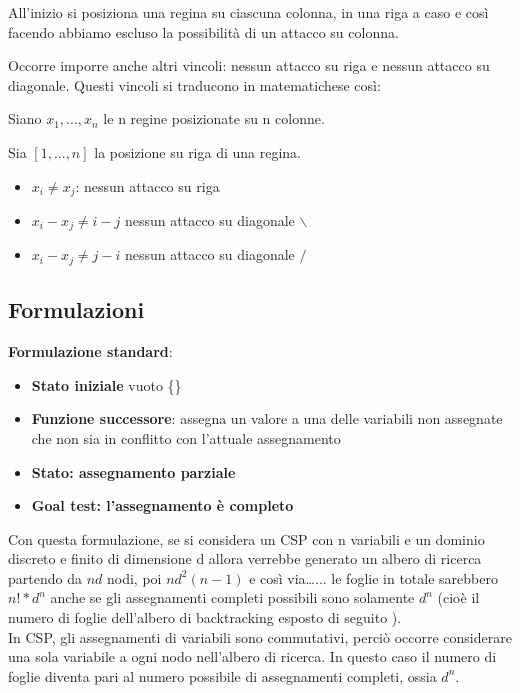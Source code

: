 All'inizio si posiziona una regina su ciascuna colonna, in una riga a caso e
così facendo abbiamo escluso la possibilità di un attacco su colonna.

Occorre imporre anche altri vincoli: nessun attacco su riga e nessun attacco su
diagonale. Questi vincoli si traducono in matematichese così:

Siano $x_1,...,x_n$ le n regine posizionate su n colonne.

Sia $[1,...,n]$ la posizione su riga di una regina.

\begin{itemize}
 \item $x_i \neq x_j$: nessun attacco su riga
 \item $x_i - x_j \neq i-j$ nessun attacco su diagonale $\backslash$
 \item $x_i - x_j \neq j-i$ nessun attacco su diagonale $/$
\end{itemize}

\subsection{Formulazioni}

\textbf{Formulazione standard}:

\begin{itemize}
 \item \textbf{Stato iniziale} vuoto \{\}
 \item \textbf{Funzione successore}: assegna un valore a una delle
variabili non assegnate che non sia in conflitto con l'attuale assegnamento
 \item \textbf{Stato: assegnamento parziale}
 \item \textbf{Goal test: l'assegnamento è completo}
\end{itemize}

Con questa formulazione, se si considera un CSP con n variabili e un dominio
discreto e finito di dimensione d allora verrebbe generato un albero di ricerca
partendo da $nd$ nodi, poi $nd^2(n-1)$ e così via\dots... le foglie in totale
sarebbero $n!*d^n$ anche se gli assegnamenti completi possibili sono solamente
$d^n$ (cioè il numero di foglie dell'albero di backtracking esposto di seguito
).\\

In CSP, gli assegnamenti di variabili sono commutativi, perciò occorre
considerare una sola variabile a ogni nodo nell'albero di ricerca.
In questo caso il numero di foglie diventa pari al numero possibile di
assegnamenti completi, ossia $d^n$.

